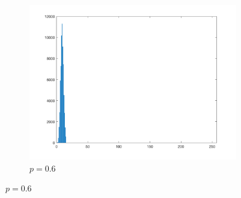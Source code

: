 \documentclass{article}
\begin{document}
\begin{enumerate}[label=(\alph*)]
\begin{figure}[!htb]
\begin{subfigure}[b]{0.3\textwidth}
            \includegraphics[width=\textwidth]{img/hist_PL06.png}
            \caption{$p = 0.6$}
        \end{subfigure}
        
        

\end{figure}
\end{enumerate}
\end{document}
